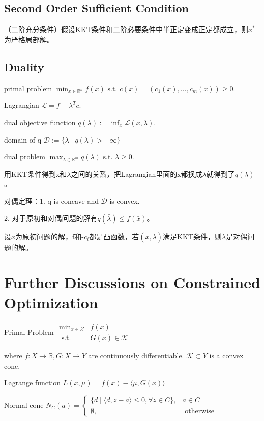 \subsection{Second Order Sufficient Condition}

（二阶充分条件）假设KKT条件和二阶必要条件中半正定变成正定都成立，则$x^{\ast}$为严格局部解。

\subsection{Duality}

primal problem $\min _{x \in \mathbb{R}^{n}} f(x) \text { s.t. } c(x) = (c_1(x), \dots, c_m(x)) \geq 0$.

Lagrangian $\mathcal{L} = f - \lambda^T c.$

dual objective function $q(\lambda):=\inf _{x} \mathcal{L}(x, \lambda)$.

domain of q $\mathcal{D}:=\{\lambda \mid q(\lambda)>-\infty\}$

dual problem $\max _{\lambda \in \mathbb{R}^{m}} q(\lambda) \text { s.t. } \lambda \geq 0$.

用KKT条件得到x和$\lambda$之间的关系，把Lagrangian里面的x都换成$\lambda$就得到了$q(\lambda)$。

对偶定理：1. q is concave and $\mathcal{D}$ is convex.

2. 对于原初和对偶问题的解有$q(\bar{\lambda}) \leq f(\bar{x})$。

设$\bar{x}$为原初问题的解，f和-$c_{i}$都是凸函数，若$(\bar{x}, \bar{\lambda})$满足KKT条件，则$\bar{\lambda}$是对偶问题的解。

\section{Further Discussions on Constrained Optimization}

Primal Problem $\begin{array}{ll}
  \min _{x \in \mathcal{X}} & f(x) \\
  \text { s.t. } & G(x) \in \mathcal{K}
\end{array}$

where $f: X \to \mathbb{R}, G: X \to Y$ are continuously differentiable. $\mathcal{K} \subset Y$ is a convex cone.

Lagrange function $L(x, \mu)=f(x)-\langle\mu, G(x)\rangle$

Normal cone $N_{C}(a)=\left\{\begin{array}{ll}
  \{d \mid\langle d, z-a\rangle \leq 0, \forall z \in C\}, & a \in C \\
  \emptyset, & \text { otherwise }
\end{array}\right.$


